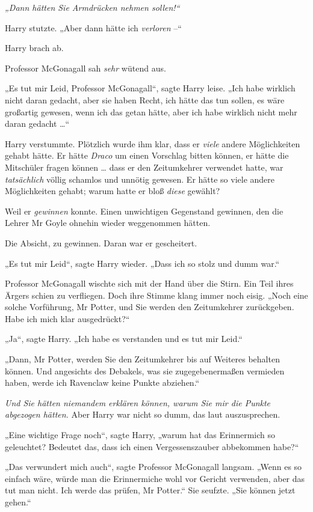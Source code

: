 {\emph{„Dann hätten Sie Armdrücken nehmen sollen!“}

Harry stutzte. „Aber dann hätte ich \emph{verloren} --“

Harry brach ab.

Professor McGonagall sah \emph{sehr} wütend aus.

„Es tut mir Leid, Professor McGonagall“, sagte Harry leise. „Ich habe wirklich nicht daran gedacht, aber sie haben Recht, ich hätte das tun sollen, es wäre großartig gewesen, wenn ich das getan hätte, aber ich habe wirklich nicht mehr daran gedacht …“

Harry verstummte. Plötzlich wurde ihm klar, dass er \emph{viele} andere Möglichkeiten gehabt hätte. Er hätte \emph{Draco} um einen Vorschlag bitten können, er hätte die Mitschüler fragen können … dass er den Zeitumkehrer verwendet hatte, war \emph{tatsächlich} völlig schamlos und unnötig gewesen. Er hätte so viele andere Möglichkeiten gehabt; warum hatte er bloß \emph{diese} gewählt?

Weil er \emph{gewinnen} konnte. Einen unwichtigen Gegenstand gewinnen, den die Lehrer Mr Goyle ohnehin wieder weggenommen hätten.

Die Absicht, zu gewinnen. Daran war er gescheitert.

„Es tut mir Leid“, sagte Harry wieder. „Dass ich so stolz und dumm war.“

Professor McGonagall wischte sich mit der Hand über die Stirn. Ein Teil ihres Ärgers schien zu verfliegen. Doch ihre Stimme klang immer noch eisig. „Noch eine solche Vorführung, Mr Potter, und Sie werden den Zeitumkehrer zurückgeben. Habe ich mich klar ausgedrückt?“

„Ja“, sagte Harry. „Ich habe es verstanden und es tut mir Leid.“

„Dann, Mr Potter, werden Sie den Zeitumkehrer bis auf Weiteres behalten können. Und angesichts des Debakels, was sie zugegebenermaßen vermieden haben, werde ich Ravenclaw keine Punkte abziehen.“

\emph{Und Sie hätten niemandem erklären können, warum Sie mir die Punkte abgezogen hätten.} Aber Harry war nicht so dumm, das laut auszusprechen.

„Eine wichtige Frage noch“, sagte Harry, „warum hat das Erinnermich so geleuchtet? Bedeutet das, dass ich einen Vergessenszauber abbekommen habe?“

„Das verwundert mich auch“, sagte Professor McGonagall langsam. „Wenn es so einfach wäre, würde man die Erinnermiche wohl vor Gericht verwenden, aber das tut man nicht. Ich werde das prüfen, Mr Potter.“ Sie seufzte. „Sie können jetzt gehen.“

}
